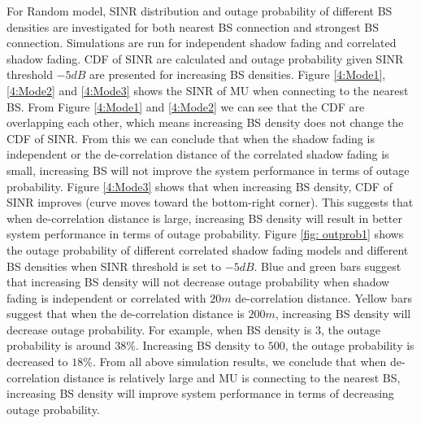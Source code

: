  \par For Random model, SINR distribution and outage probability of different BS densities are investigated for both nearest BS connection and strongest BS connection. Simulations are run for independent shadow fading and correlated shadow fading. CDF of SINR are calculated and outage probability given SINR threshold $-5dB$ are presented for increasing BS densities. Figure \ref{4:Mode1}, \ref{4:Mode2} and \ref{4:Mode3} shows the SINR of MU when connecting to the nearest BS. From Figure \ref{4:Mode1} and \ref{4:Mode2} we can see that the CDF are overlapping each other, which means increasing BS density does not change the CDF of SINR. From this we can conclude that when the shadow fading is independent or the de-correlation distance of the correlated shadow fading is small, increasing BS will not improve the system performance in terms of outage probability. Figure \ref{4:Mode3}  shows that when increasing BS density, CDF of SINR improves (curve moves toward the bottom-right corner). This suggests that when de-correlation distance is large, increasing BS density will result in better system performance in terms of outage probability. Figure \ref{fig: outprob1} shows the outage probability of different correlated shadow fading models and different BS densities when SINR threshold is set to $-5dB$. Blue and green bars suggest that increasing BS density will not decrease outage probability when shadow fading is independent or correlated with $20m$ de-correlation distance. Yellow bars suggest that when the de-correlation distance is $200m$, increasing BS density will decrease outage probability. For example, when BS density is $3$, the outage probability is around $38\%$. Increasing BS density to $500$, the outage probability is decreased to $18\%$. From all above simulation results, we conclude that when de-correlation distance is relatively large and MU is connecting to the nearest BS, increasing BS density will improve system performance in terms of decreasing outage probability.



